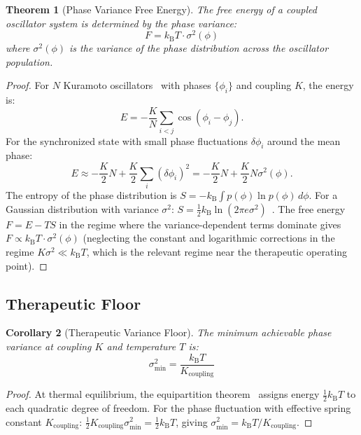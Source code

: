 \documentclass[10pt,twocolumn]{article}
\newtheorem{theorem}{Theorem}[section]
\newtheorem{corollary}[theorem]{Corollary}
\theoremstyle{remark}
\newcommand{\kB}{k_{\mathrm{B}}}
\begin{document}
\begin{theorem}[Phase Variance Free Energy]
\label{thm:variance_fe}
The free energy of a coupled oscillator system is determined by the phase variance:
\begin{equation}
\boxed{F = \kB T \cdot \sigma^2(\phi)}
\label{eq:variance_fe}
\end{equation}
where $\sigma^2(\phi)$ is the variance of the phase distribution across the oscillator population.
\end{theorem}

\begin{proof}
For $N$ Kuramoto oscillators~\cite{kuramoto1984chemical} with phases $\{\phi_i\}$ and coupling $K$, the energy is:
\begin{equation}
E = -\frac{K}{N} \sum_{i<j} \cos(\phi_i - \phi_j).
\end{equation}
For the synchronized state with small phase fluctuations $\delta\phi_i$ around the mean phase:
\begin{equation}
E \approx -\frac{K}{2}N + \frac{K}{2} \sum_i (\delta\phi_i)^2 = -\frac{K}{2}N + \frac{K}{2}N\sigma^2(\phi).
\end{equation}
The entropy of the phase distribution is $S = -\kB \int p(\phi) \ln p(\phi)\,d\phi$. For a Gaussian distribution with variance $\sigma^2$: $S = \frac{1}{2}\kB \ln(2\pi e \sigma^2)$~\cite{cover2006elements}. The free energy $F = E - TS$ in the regime where the variance-dependent terms dominate gives $F \propto \kB T \cdot \sigma^2(\phi)$ (neglecting the constant and logarithmic corrections in the regime $K\sigma^2 \ll \kB T$, which is the relevant regime near the therapeutic operating point).
\end{proof}

\subsection{Therapeutic Floor}

\begin{corollary}[Therapeutic Variance Floor]
\label{cor:floor}
The minimum achievable phase variance at coupling $K$ and temperature $T$ is:
\begin{equation}
\sigma^2_{\min} = \frac{\kB T}{K_{\mathrm{coupling}}}
\label{eq:floor}
\end{equation}
\end{corollary}

\begin{proof}
At thermal equilibrium, the equipartition theorem~\cite{callen1985thermodynamics} assigns energy $\frac{1}{2}\kB T$ to each quadratic degree of freedom. For the phase fluctuation with effective spring constant $K_{\mathrm{coupling}}$: $\frac{1}{2}K_{\mathrm{coupling}} \sigma^2_{\min} = \frac{1}{2}\kB T$, giving $\sigma^2_{\min} = \kB T / K_{\mathrm{coupling}}$.
\end{proof}
\end{document}
